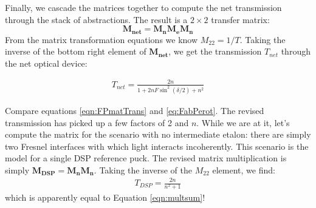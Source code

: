 Finally, we cascade the matrices together to compute the net transmission through the stack of abstractions.  The result is a $2\times2$ transfer matrix: $$\boldsymbol{M_{net}}=\boldsymbol{M_n}\boldsymbol{M_e}\boldsymbol{M_n}$$  From the matrix transformation equations \cite{2007SalehTeich} we know $M_{22}=1/T$.  Taking the inverse of the bottom right element of $\boldsymbol{M_{net}}$, we get the transmission $T_{net}$ through the net optical device: 

\begin{eqnarray}
T_{net}=\frac{2 n}{1+ 2n F\sin ^2(\delta/2)+n^2} \label{eqn:FPmatTrans}
\end{eqnarray}

Compare equations \ref{eqn:FPmatTrans} and \ref{eq:FabPerot}.  The revised transmission has picked up a few factors of 2 and $n$.  While we are at it, let's compute the matrix for the scenario with no intermediate etalon: there are simply two Fresnel interfaces with which light interacts incoherently.  This scenario is the model for a single DSP reference puck. The revised matrix multiplication is simply $\boldsymbol{M_{DSP}}=\boldsymbol{M_n}\boldsymbol{M_n}$.  Taking the inverse of the $M_{22}$ element, we find: 
\begin{eqnarray}
T_{DSP}=\frac{2 n}{n^2+1}\label{eqn:EqofSummedSlab}
\end{eqnarray}
which is apparently equal to Equation \ref{eqn:multsum}!